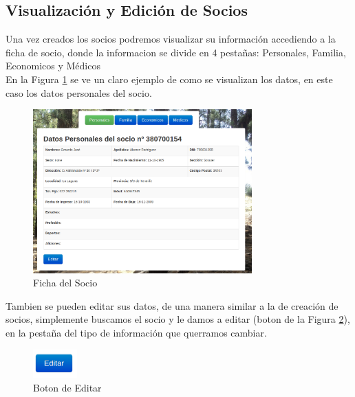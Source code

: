 \subsection{Visualización y Edición de Socios}

Una vez creados los socios podremos visualizar su información accediendo a la ficha de socio, donde la informacion se divide en 4 pestañas: Personales, Familia, Economicos y Médicos \\

En la Figura \ref{fig:ficha_socio} se ve un claro ejemplo de como se visualizan los datos, en este caso los datos personales del socio.\\

\begin{figure}[H]
\begin{center}
\includegraphics[width=0.75\textwidth]{images/datos_personales.jpg}
\caption{Ficha del Socio}
\label{fig:ficha_socio}
\end{center}
\end{figure}

Tambien se pueden editar sus datos, de una manera similar a la de creación de socios, simplemente buscamos el socio y le damos a editar (boton de la Figura \ref{fig:edit}), en la pestaña del tipo de información
que querramos cambiar.\\

\begin{figure}[H]
\begin{center}
\includegraphics[width=0.15\textwidth]{images/boton_editar.jpg}
\caption{Boton de Editar}
\label{fig:edit}
\end{center}
\end{figure}

